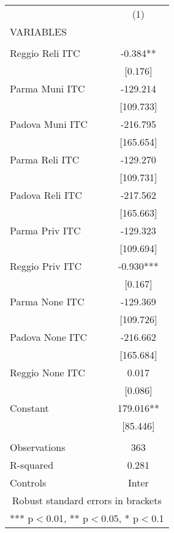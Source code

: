 \begin{tabular}{lc} \hline
 & (1) \\
VARIABLES &  \\ \hline
 &  \\
Reggio Reli ITC & -0.384** \\
 & [0.176] \\
Parma Muni ITC & -129.214 \\
 & [109.733] \\
Padova Muni ITC & -216.795 \\
 & [165.654] \\
Parma Reli ITC & -129.270 \\
 & [109.731] \\
Padova Reli ITC & -217.562 \\
 & [165.663] \\
Parma Priv ITC & -129.323 \\
 & [109.694] \\
Reggio Priv ITC & -0.930*** \\
 & [0.167] \\
Parma None ITC & -129.369 \\
 & [109.726] \\
Padova None ITC & -216.662 \\
 & [165.684] \\
Reggio None ITC & 0.017 \\
 & [0.086] \\
Constant & 179.016** \\
 & [85.446] \\
 &  \\
Observations & 363 \\
R-squared & 0.281 \\
 Controls & Inter \\ \hline
\multicolumn{2}{c}{ Robust standard errors in brackets} \\
\multicolumn{2}{c}{ *** p$<$0.01, ** p$<$0.05, * p$<$0.1} \\
\end{tabular}
